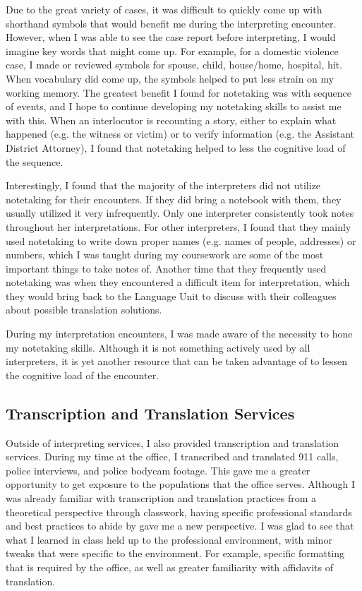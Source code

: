 \documentclass{article}
\begin{document}
Due to the great variety of cases, it was difficult to quickly come up with shorthand symbols that would benefit me during the interpreting encounter. However, when I was able to see the case report before interpreting, I would imagine key words that might come up. For example, for a domestic violence case, I made or reviewed symbols for spouse, child, house/home, hospital, hit. When vocabulary did come up, the symbols helped to put less strain on my working memory. The greatest benefit I found for notetaking was with sequence of events, and I hope to continue developing my notetaking skills to assist me with this. When an interlocutor is recounting a story, either to explain what happened (e.g. the witness or victim) or to verify information (e.g. the Assistant District Attorney), I found that notetaking helped to less the cognitive load of the sequence.

Interestingly, I found that the majority of the interpreters did not utilize notetaking for their encounters. If they did bring a notebook with them, they usually utilized it very infrequently. Only one interpreter consistently took notes throughout her interpretations. For other interpreters, I found that they mainly used notetaking to write down proper names (e.g. names of people, addresses) or numbers, which I was taught during my coursework are some of the most important things to take notes of. Another time that they frequently used notetaking was when they encountered a difficult item for interpretation, which they would bring back to the Language Unit to discuss with their colleagues about possible translation solutions.

During my interpretation encounters, I was made aware of the necessity to hone my notetaking skills. Although it is not something actively used by all interpreters, it is yet another resource that can be taken advantage of to lessen the cognitive load of the encounter. 

\subsection{Transcription and Translation Services}

Outside of interpreting services, I also provided transcription and translation services. During my time at the office, I transcribed and translated 911 calls, police interviews, and police bodycam footage. This gave me a greater opportunity to get exposure to the populations that the office serves. Although I was already familiar with transcription and translation practices from a theoretical perspective through classwork, having specific professional standards and best practices to abide by gave me a new perspective. I was glad to see that what I learned in class held up to the professional environment, with minor tweaks that were specific to the environment. For example, specific formatting that is required by the office, as well as greater familiarity with affidavits of translation.
\end{document}
